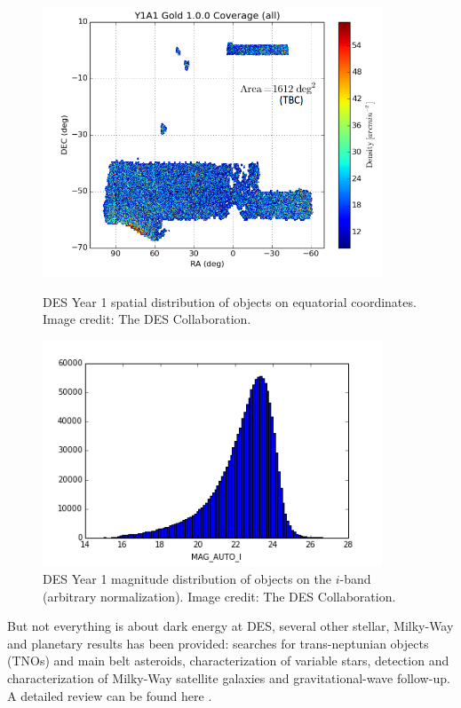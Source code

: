 \begin{figure}
\begin{center}
\includegraphics[width=0.9\textwidth]{./Pictures/des_y1_coverage.png}
\caption{DES Year 1 spatial distribution of objects on equatorial coordinates. Image credit: The DES Collaboration.}
\label{fig:des_y1_coverage}

\includegraphics[width=0.9\textwidth]{./Pictures/des_y1_mag_auto_i.png}
\caption{DES Year 1 magnitude distribution of objects on the $i$-band (arbitrary normalization). Image credit: The DES Collaboration.}
\label{fig:des_y1_mag_auto_i}
\end{center}
\end{figure}
\newline

But not everything is about dark energy at DES, several other stellar, Milky-Way and planetary results has been provided: searches for trans-neptunian objects (TNOs) and main belt asteroids, characterization of variable stars, detection and characterization of Milky-Way satellite galaxies and gravitational-wave follow-up. A detailed review can be found here \cite{2016MNRAS.460.1270D}.